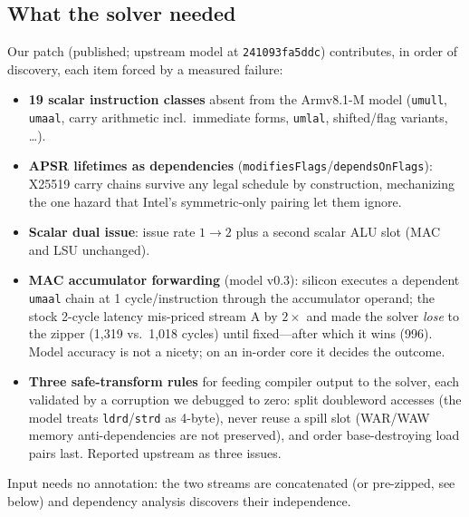 \documentclass[11pt,a4paper]{article}
\begin{document}
\subsection{What the solver needed}
Our patch (published; upstream model at \texttt{241093fa5ddc}) contributes,
in order of discovery, each item forced by a measured failure:
\begin{itemize}[leftmargin=*]
\item \textbf{19 scalar instruction classes} absent from the Armv8.1-M model
      (\texttt{umull}, \texttt{umaal}, carry arithmetic incl.\ immediate forms,
      \texttt{umlal}, shifted/flag variants, \ldots).
\item \textbf{APSR lifetimes as dependencies}
      (\texttt{modifiesFlags}/\texttt{dependsOnFlags}): X25519 carry chains
      survive any legal schedule by construction, mechanizing the one hazard
      that Intel's symmetric-only pairing let them ignore.
\item \textbf{Scalar dual issue}: issue rate $1\to2$ plus a second scalar ALU
      slot (MAC and LSU unchanged).
\item \textbf{MAC accumulator forwarding} (model v0.3): silicon executes a
      dependent \texttt{umaal} chain at 1 cycle/instruction through the
      accumulator operand; the stock 2-cycle latency mis-priced stream A by
      $2\times$ and made the solver \emph{lose} to the zipper (1,319 vs.\
      1,018 cycles) until fixed---after which it wins (996). Model accuracy is
      not a nicety; on an in-order core it decides the outcome.
\item \textbf{Three safe-transform rules} for feeding compiler output to the
      solver, each validated by a corruption we debugged to zero: split
      doubleword accesses (the model treats \texttt{ldrd}/\texttt{strd} as
      4-byte), never reuse a spill slot (WAR/WAW memory anti-dependencies are
      not preserved), and order base-destroying load pairs last. Reported
      upstream as three issues.
\end{itemize}
Input needs no annotation: the two streams are concatenated (or pre-zipped, see
below) and dependency analysis discovers their independence.
\end{document}
